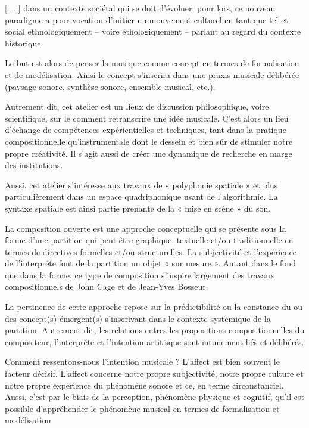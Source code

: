 \documentclass{article}
\newcommand{\footref}[1]{%
  \enotezwritemark{\enmarkstyle\ref{#1}}%
}
\begin{document}

\bigskip


[ … ] dans un contexte sociétal qui se doit d'évoluer; pour lors, ce nouveau paradigme a pour vocation d'initier un mouvement culturel en tant que tel et social ethnologiquement -- voire éthologiquement -- parlant au regard du contexte historique.%


Le but est alors de penser la musique comme concept en termes de formalisation et de modélisation. Ainsi le concept s’inscrira dans une praxis\footref{efn:pr} musicale délibérée (paysage sonore, synthèse sonore, ensemble musical, etc.).

Autrement dit, cet atelier est un lieux de discussion philosophique, voire scientifique, sur le comment retranscrire une idée musicale. C'est alors un lieu d'échange de compétences expérientielles et techniques, tant dans la pratique compositionnelle qu'instrumentale dont le dessein et bien sûr de stimuler notre propre créativité. Il s'agit aussi de créer une dynamique de recherche en marge des institutions.


Aussi, cet atelier s’intéresse aux travaux de « polyphonie spatiale » et plus particulièrement dans un espace quadriphonique usant de l'algorithmie.
La syntaxe spatiale est ainsi partie prenante de la « mise en scène » du son.

La composition ouverte est une approche conceptuelle qui se présente sous la forme d’une partition qui peut être graphique, textuelle et/ou traditionnelle en termes de directives formelles et/ou structurelles. La subjectivité et l’expérience de l’interpréte font de la partition un objet « sur mesure ». Autant dans le fond que dans la forme, ce type de composition s’inspire largement des travaux compositionnels de John Cage et de Jean-Yves Bosseur.

La pertinence de cette approche repose sur la prédictibilité ou la constance du ou des concept(s) émergent(s) s’inscrivant dans le contexte systémique de la partition. Autrement dit, les relations entres les propositions compositionnelles du compositeur, l’interpréte et l’intention artitisque sont intimement liés et délibérés.

Comment ressentons-nous l’intention musicale ? L’affect est bien souvent le facteur décisif. L’affect concerne notre propre subjectivité, notre propre culture et notre propre expérience du phénomène sonore et ce, en terme circonstanciel. Aussi, c’est par le biais de la perception, phénomène physique et cognitif, qu’il est possible d’appréhender le phénomène musical en termes de formalisation et modélisation.
\end{document}
